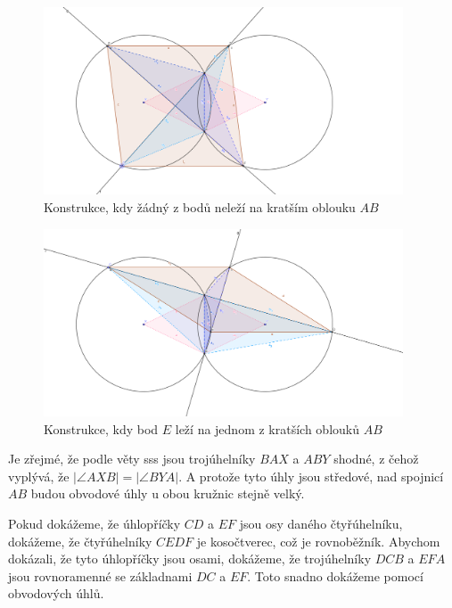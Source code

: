 \documentclass{fkssolpub}
\author{Ondřej Sedláček}
\begin{document}
\begin{figure}[h!]
	\begin{center}
		\includegraphics[width=0.95\textwidth]{6-fig-2.png}
	\end{center}
	\caption{Konstrukce, kdy žádný z bodů neleží na kratším oblouku $AB$}
	\label{fig:1}
\end{figure}

\begin{figure}[h!]
	\begin{center}
		\includegraphics[width=0.95\textwidth]{6-fig-1.png}
	\end{center}
	\caption{Konstrukce, kdy bod $E$ leží na jednom z kratších oblouků $AB$}
	\label{fig:2}
\end{figure}

Je zřejmé, že podle věty sss jsou trojúhelníky $BAX$ a $ABY$ shodné, z čehož vyplývá, že $|\angle AXB| = |\angle BYA|$. A protože tyto úhly jsou středové, nad spojnicí $AB$ budou obvodové úhly u obou kružnic stejně velký.

Pokud dokážeme, že úhlopříčky $CD$ a $EF$ jsou osy daného čtyřúhelníku, dokážeme, že čtyřúhelníky $CEDF$ je kosočtverec, což je rovnoběžník. Abychom dokázali, že tyto úhlopříčky jsou osami, dokážeme, že trojúhelníky $DCB$ a $EFA$ jsou rovnoramenné se základnami $DC$ a $EF$. Toto snadno dokážeme pomocí obvodových úhlů.
\end{document}
